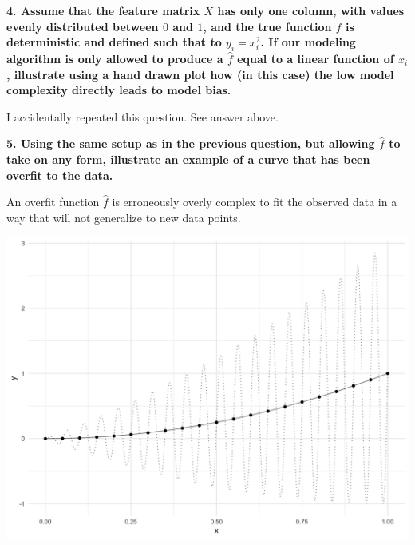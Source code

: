 \documentclass[12pt,hidelinks]{article}
\numberwithin{equation}{section}
\begin{document}
\textbf{4. Assume that the feature matrix $X$ has only one column, with values
evenly distributed between $0$ and $1$, and the true function $f$ is
deterministic and defined such that to $y_i = x_i^2$. If our modeling
algorithm is only allowed to produce a $\widehat{f}$ equal to a linear
function of $x_i$, illustrate using a hand drawn plot how (in this case) the
low model complexity directly leads to model bias.}

\vspace*{12pt}

I accidentally repeated this question. See answer above.

\vspace*{12pt}


\textbf{5. Using the same setup as in the previous question, but allowing
$\widehat{f}$ to take on any form, illustrate an example of a curve that has
been overfit to the data.}

\vspace*{12pt}

An overfit function $\widehat{f}$ is erroneously overly complex to fit the
observed data in a way that will not generalize to new data points.




\begin{center}
\includegraphics[width=\textwidth]{figures/sol01-fig02}
\end{center}
\end{document}
